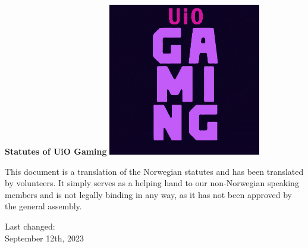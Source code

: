 \begin{titlepage}
\begin{center}
    \vspace*{1cm}

    \Huge
    \textbf{Statutes of UiO Gaming}
    \vspace{1cm}
    \vspace{3cm}
    \includegraphics[width=0.5\textwidth]{images/logo.jpg}
    \vspace{3cm}


    \small{This document is a translation of the Norwegian statutes and has been translated by volunteers. It simply serves as a helping hand to our non-Norwegian speaking members and is not legally binding in any way, as it has not been approved by the general assembly.}
    \vspace{3cm}

    \LARGE
    Last changed:\\
    September 12th, 2023
\end{center}
\end{titlepage}